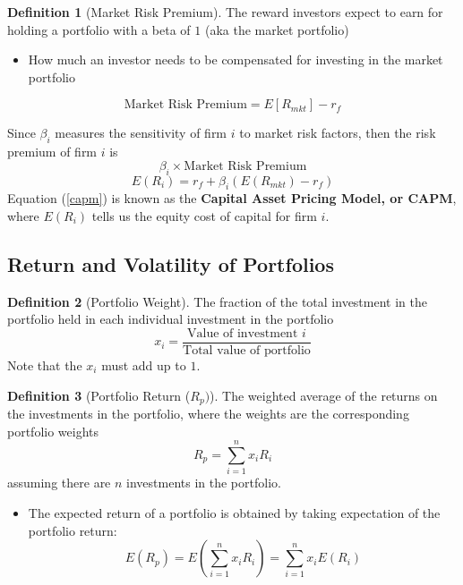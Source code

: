 \documentclass[11pt]{article}
\theoremstyle{definition}
\newtheorem*{definition}{Definition}
\begin{document}
\begin{definition}[Market Risk Premium]
    The reward investors expect to earn for holding a portfolio with a beta of $1$ (aka the market portfolio)
    \begin{itemize}
        \item How much an investor needs to be compensated for investing in the market portfolio
    \end{itemize}
    \begin{equation*}
        \text{Market Risk Premium} = E[R_{mkt}] - r_f
    \end{equation*}
\end{definition}
Since $\beta_i$ measures the sensitivity of firm $i$ to market risk factors, then the risk premium of firm $i$ is 
\begin{equation*}
    \beta_i\times \text{Market Risk Premium}
\end{equation*}
\begin{equation}\label{capm}
    E(R_i) = r_f + \beta_i(E(R_{mkt}) - r_f)
\end{equation}
Equation (\ref{capm}) is known as the \textbf{Capital Asset Pricing Model, or CAPM}, where $E(R_i)$ tells us the equity cost of capital for firm $i$.

\subsection{Return and Volatility of Portfolios}
\begin{definition}[Portfolio Weight]
    The fraction of the total investment in the portfolio held in each individual investment in the portfolio
    \begin{equation*}
        x_i = \frac{\text{Value of investment }i}{\text{Total value of portfolio}}
    \end{equation*}
    Note that the $x_i$ must add up to $1$.
\end{definition}
\begin{definition}[Portfolio Return ($R_p)$]
    The weighted average of the returns on the investments in the portfolio, where the weights are the corresponding portfolio weights
    \begin{equation*}
        R_p = \sum_{i=1}^n x_i R_i
    \end{equation*}
    assuming there are $n$ investments in the portfolio.
\end{definition}
\begin{itemize}
    \item The expected return of a portfolio is obtained by taking expectation of the portfolio return:
    \begin{equation*}
        E(R_p) = E\left(\sum_{i=1}^n x_iR_i\right) = \sum_{i=1}^n x_i E(R_i)
    \end{equation*}
\end{itemize}
\end{document}
